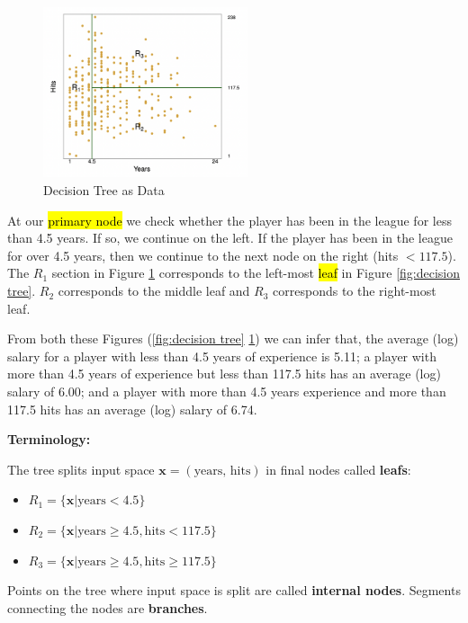\documentclass[11pt]{article}
\begin{document}
\begin{figure}[h]
    \centering
    \includegraphics[width=6cm]{pic/decision tree parts.png}
    \caption{Decision Tree as Data}
    \label{fig:decision tree parts}
\end{figure}

At our \hl{primary node} we check whether the player has been in the league for less than 4.5 years. If so, we continue on the left. If the player has been in the league for over 4.5 years, then we continue to the next node on the right (hits $< 117.5$). The $R_1$ section in Figure \ref{fig:decision tree parts} corresponds to the left-most \hl{leaf} in Figure \ref{fig:decision tree}. $R_2$ corresponds to the middle leaf and $R_3$ corresponds to the right-most leaf. 

\begin{note}
    From both these Figures (\ref{fig:decision tree} \ref{fig:decision tree parts}) we can infer that, the average (log) salary for a player with less than 4.5 years of experience is 5.11; a player with more than 4.5 years of experience but less than 117.5 hits has an average (log) salary of 6.00; and a player with more than 4.5 years experience and more than 117.5 hits has an average (log) salary of 6.74.
\end{note}

\begin{shaded}
    \textbf{Terminology:}

    The tree splits input space $\mathbf{x} = (\text{years, hits})$ in final nodes called \textbf{leafs}:

    \begin{itemize}
        \item $R_1 = \{\mathbf{x}|\text{years} < 4.5\}$
        \item $R_2 = \{\mathbf{x}|\text{years} \geq 4.5, \text{hits}<117.5\}$
        \item $R_3 = \{\mathbf{x}|\text{years} \geq 4.5, \text{hits}\geq 117.5\}$
    \end{itemize}

    Points on the tree where input space is split are called \textbf{internal nodes}. Segments connecting the nodes are \textbf{branches}.
\end{shaded}
\end{document}
